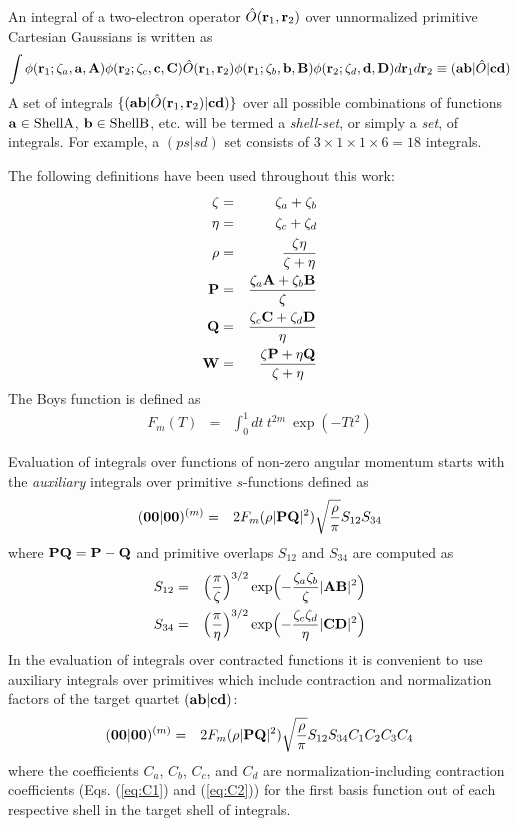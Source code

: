 \documentclass[12pt]{article}
\begin{document}
An integral of a two-electron operator $\hat{O}({\bf r}_1, {\bf r}_2)$ over unnormalized
primitive Cartesian Gaussians is written as
\begin{eqnarray}
\int \phi({\bf r}_1; \zeta_a, {\bf a}, {\bf A}) \phi ({\bf r}_2; \zeta_c, {\bf c}, {\bf C}) \hat{O}({\bf r}_1, {\bf r}_2)
\phi({\bf r}_1; \zeta_b, {\bf b}, {\bf B}) \phi({\bf r}_2; \zeta_d, {\bf d}, {\bf D}) d{\bf r}_1 d{\bf r}_2 \equiv ({\bf ab} |\hat{O}|{\bf cd})
\end{eqnarray}
A set of integrals $\{ ({\bf a} {\bf b}|\hat{O}({\bf r}_1, {\bf r}_2)|{\bf c} {\bf d}) \}$
over all possible combinations of functions ${\bf a} \in {\rm Shell A}$, ${\bf b} \in {\rm Shell B}$, etc.
will be termed a {\em shell-set}, or simply a {\em set}, of integrals. For example, a $(ps|sd)$ set consists of
$3 \times 1 \times 1 \times 6 = 18$ integrals.

The following definitions have been used throughout this work:
\begin{eqnarray}
\zeta & = & \zeta_a + \zeta_b \\
\eta  & = & \zeta_c + \zeta_d \\
\rho  & = & \frac{\zeta\eta}{\zeta+\eta} \\
{\bf P}& = & \frac{\zeta_a {\bf A} + \zeta_b {\bf B}}{\zeta} \\
{\bf Q}& = & \frac{\zeta_c {\bf C} + \zeta_d {\bf D}}{\eta} \\
{\bf W}& = & \frac{\zeta {\bf P} + \eta {\bf Q}}{\zeta+\eta}
\end{eqnarray}
The Boys function is defined as
\begin{eqnarray}
F_m(T) & = & \int_0^{1} dt\ t^{2m}\ \exp (-Tt^2)
\end{eqnarray}

Evaluation of integrals over functions of non-zero angular momentum starts with the
{\em auxiliary} integrals over primitive $s$-functions
defined as
\begin{eqnarray}
\label{eq:0000m}
({\bf 00}|{\bf 00})^{(m)} & = & 2 F_m(\rho |{\bf PQ}|^2) \sqrt{\frac{\rho}{\pi}}S_{12}S_{34}
\end{eqnarray}
where ${\bf PQ} = {\bf P} - {\bf Q}$ and primitive overlaps $S_{12}$ and $S_{34}$
are computed as
\begin{eqnarray}
S_{12} & = & \Bigl( \frac{\pi}{\zeta} \Bigr)^{3/2}
\exp \Bigl(-\frac{\zeta_a\zeta_b}{\zeta} |{\bf AB}|^2 \Bigr) \\
S_{34} & = & \Bigl( \frac{\pi}{\eta} \Bigr)^{3/2}
\exp \Bigl(-\frac{\zeta_c\zeta_d}{\eta} |{\bf CD}|^2 \Bigr)
\end{eqnarray}
In the evaluation of integrals over contracted functions it is convenient to
use auxiliary integrals over primitives which include contraction and normalization factors of the
target quartet $({\bf ab}|{\bf cd})$:
\begin{eqnarray} \label{eq:0000m}
({\bf 00}|{\bf 00})^{(m)} & = &  2 F_m(\rho |{\bf PQ}|^2) \sqrt{\frac{\rho}{\pi}}S_{12}S_{34}
C_1 C_2 C_3 C_4
\end{eqnarray}
where the coefficients $C_a$, $C_b$, $C_c$, and $C_d$ are
normalization-including contraction coefficients (Eqs. (\ref{eq:C1})
and (\ref{eq:C2})) for the first basis function out of each respective shell
in the target shell of integrals.
\end{document}
